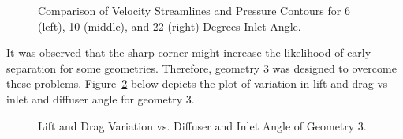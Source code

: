 \begin{figure}[!hb]
   \noindent{}
   \caption{Comparison of Velocity Streamlines and Pressure Contours for 6 (left), 10 (middle), and 22 (right) Degrees Inlet Angle.}
   \label{fig:A1_Contour_inlet_compare}
\end{figure}

\noindent It was observed that the sharp corner might increase the likelihood of early separation for some geometries. Therefore, geometry 3 was designed to overcome these problems. Figure~\ref{fig:2D_OF_A4_results} below depicts the plot of variation in lift and drag vs inlet and diffuser angle for geometry 3.

\begin{figure}[!ht]
    \noindent{}
    \caption{Lift and Drag Variation vs. Diffuser and Inlet Angle of Geometry 3.}
    \label{fig:2D_OF_A4_results}
\end{figure}


